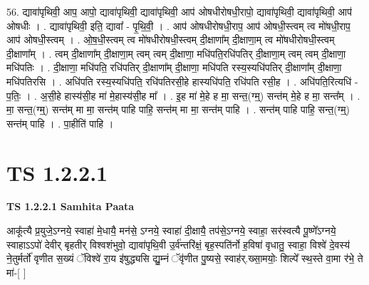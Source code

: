\documentclass[17pt]{extarticle}
\begin{document}
56. द्यावा॑पृथिवी॒ आप॒ आपो॒ द्यावा॑पृथिवी॒ द्यावा॑पृथिवी॒ आप॑ ओषधीरोषधी॒रापो॒ द्यावा॑पृथिवी॒ द्यावा॑पृथिवी॒ आप॑ ओषधीः । . द्यावा॑पृथिवी॒ इति॒ द्यावा᳚ - पृ॒थि॒वी॒ । . आप॑ ओषधीरोषधी॒राप॒ आप॑ ओषधी॒स्त्वम् त्व मो॑षधी॒राप॒ आप॑ ओषधी॒स्त्वम् । . ओ॒ष॒धी॒स्त्वम् त्व मो॑षधीरोषधी॒स्त्वम् दी॒क्षाणा᳚म् दी॒क्षाणा॒म् त्व मो॑षधीरोषधी॒स्त्वम् दी॒क्षाणा᳚म् । . त्वम् दी॒क्षाणा᳚म् दी॒क्षाणा॒म् त्वम् त्वम् दी॒क्षाणा॒ मधि॑पति॒रधि॑पतिर् दी॒क्षाणा॒म् त्वम् त्वम् दी॒क्षाणा॒ मधि॑पतिः । . दी॒क्षाणा॒ मधि॑पति॒ रधि॑पतिर् दी॒क्षाणा᳚म् दी॒क्षाणा॒ मधि॑पति रस्य॒स्यधि॑पतिर् दी॒क्षाणा᳚म् दी॒क्षाणा॒ मधि॑पतिरसि । . अधि॑पति रस्य॒स्यधि॑पति॒ रधि॑पतिरसी॒हे हास्यधि॑पति॒ रधि॑पति रसी॒ह । . अधि॑पति॒रित्यधि॑ - प॒तिः॒ । . अ॒सी॒हे हास्य॑सी॒ह मा॑ मे॒हास्य॑सी॒ह मा᳚ । . इ॒ह मा॑ मे॒हे ह मा॒ सन्त॒(ग्म्॒) सन्त॑म् मे॒हे ह मा॒ सन्त᳚म् । . मा॒ सन्त॒(ग्म्॒) सन्त॑म् मा मा॒ सन्त॑म् पाहि पाहि॒ सन्त॑म् मा मा॒ सन्त॑म् पाहि । . सन्त॑म् पाहि पाहि॒ सन्त॒(ग्म्॒) सन्त॑म् पाहि । . पा॒हीति॑ पाहि । \newline
\pagebreak
{}

\section{ TS 1.2.2.1 }

\textbf{TS 1.2.2.1 } \newline
\textbf{Samhita Paata} \newline

आकू᳚त्यै प्र॒युजे॒ऽग्नये॒ स्वाहा॑ मे॒धायै॒ मन॑से॒ ऽग्नये॒ स्वाहा॑ दी॒क्षायै॒ तप॑से॒ऽग्नये॒ स्वाहा॒ सर॑स्वत्यै पू॒ष्णे᳚ऽग्नये॒ स्वाहाऽऽपो॑ देवीर् बृहतीर् विश्वशंभुवो॒ द्यावा॑पृथि॒वी उ॒र्व॑न्तरि॑क्षं॒ बृह॒स्पति॑र्नो ह॒विषा॑ वृधातु॒ स्वाहा॒ विश्वे॑ दे॒वस्य॑ ने॒तुर्मर्तो॑ वृणीत स॒ख्यं ॅविश्वे॑ रा॒य इ॑षुद्ध्यसि द्यु॒म्नं ॅवृ॑णीत पु॒ष्यसे॒ स्वाह॑र्.ख्सा॒मयोः॒ शिल्पे᳚ स्थ॒स्ते वा॒मा र॑भे॒ ते मा॑-[ ] \newline
\end{document}
